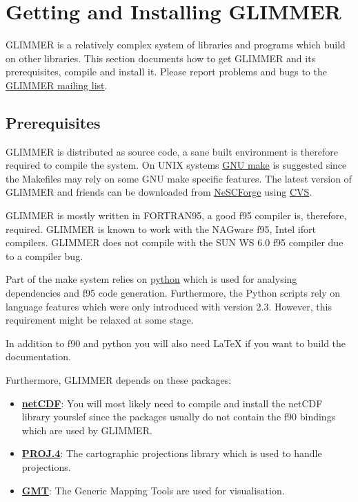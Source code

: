 \section{Getting and Installing GLIMMER}
GLIMMER is a relatively complex system of libraries and programs which build on other libraries. This section documents how to get GLIMMER and its prerequisites, compile and install it. Please report problems and bugs to the \href{http://forge.nesc.ac.uk/mailman/listinfo/glimmer-discuss}{GLIMMER mailing list}.

\subsection{Prerequisites}
GLIMMER is distributed as source code, a sane built environment is therefore required to compile the system. On UNIX systems \href{http://www.gnu.org/software/make/}{GNU make} is suggested since the Makefiles may rely on some GNU make specific features. The latest version of GLIMMER and friends can be downloaded from \href{http://forge.nesc.ac.uk/}{NeSCForge} using \href{http://www.gnu.org/software/cvs/}{CVS}.

GLIMMER is mostly written in FORTRAN95, a good f95 compiler is, therefore, required. GLIMMER is known to work with the NAGware f95, Intel ifort compilers. GLIMMER does not compile with the SUN WS 6.0 f95 compiler due to a compiler bug.

Part of the make system relies on \href{http://www.python.org}{python} which is used for analysing dependencies and f95 code generation. Furthermore, the Python scripts rely on language features which were only introduced with version 2.3. However, this requirement might be relaxed at some stage.

In addition to f90 and python you will also need {\LaTeX} if you want to build the documentation.

Furthermore, GLIMMER depends on these packages:
\begin{itemize}
\item \href{http://www.unidata.ucar.edu/packages/netcdf/index.html}{{\bf netCDF}}: You will most likely need to compile and install the netCDF library yourslef since the packages usually do not contain the f90 bindings which are used by GLIMMER.
\item \href{http://www.remotesensing.org/proj}{{\bf PROJ.4}}: The cartographic projections library which is used to handle projections.
\item \href{http://gmt.soest.hawaii.edu/}{{\bf GMT}}: The Generic Mapping Tools are used for visualisation.
\end{itemize}


